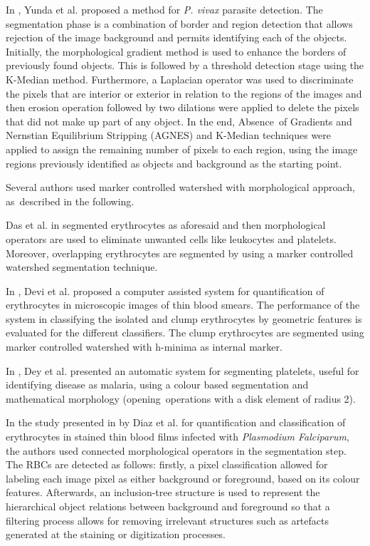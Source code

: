 \documentclass[final,a4paper,12pt,english]{UnicaPhdThesis3}
\begin{document}
In \cite{Yunda2012}, Yunda et al. proposed a method for \textit{P. vivax} parasite detection. The segmentation phase is a combination of border and region detection that allows rejection of the image background and permits identifying each of the objects. Initially, the morphological gradient method is used to enhance the borders of previously found objects. This is followed by a threshold detection stage using the K-Median method.
Furthermore, a Laplacian operator was used to discriminate the pixels that are interior or exterior in relation to the regions of the images and then erosion operation followed by two dilations were applied to delete the pixels that did not make up part of any object. In the end, Absence~of Gradients and Nernstian Equilibrium Stripping (AGNES) and K-Median techniques were applied to assign the remaining number of pixels to each region, using the image regions previously identified as objects and background as the starting point.

Several authors used marker controlled watershed \cite{Soille2004} with morphological approach, as~described in the following.

Das et al. in \cite{Das2011,Das2013,Das2014,Das2015} segmented erythrocytes as aforesaid and then morphological operators are used to eliminate unwanted cells like leukocytes and platelets. Moreover, overlapping erythrocytes are segmented by using a marker controlled watershed segmentation technique.

In \cite{Devi2017}, Devi et al. proposed a computer assisted system for quantification of erythrocytes in microscopic images of thin blood smears. The performance of the system in classifying the isolated and clump erythrocytes by geometric features is evaluated for the different classifiers. The clump erythrocytes are segmented using marker controlled watershed with h-minima as internal marker.

In \cite{Dey2015}, Dey et al. presented an automatic system for segmenting platelets, useful for identifying disease as malaria, using a colour based segmentation and mathematical morphology (opening~operations with a disk element of radius 2).

In the study presented in \cite{Diaz2009} by Diaz et al. for quantification and classification of erythrocytes in stained thin blood films infected with \textit{Plasmodium Falciparum}, the authors used connected morphological operators in the segmentation step. The RBCs are detected as follows: firstly, a pixel classification allowed for labeling each image pixel as either background or foreground, based on its colour features. Afterwards, an inclusion-tree structure is used to represent the hierarchical object relations between background and foreground so that a filtering process allows for removing irrelevant structures such as artefacts generated at the staining or digitization processes.
\end{document}
